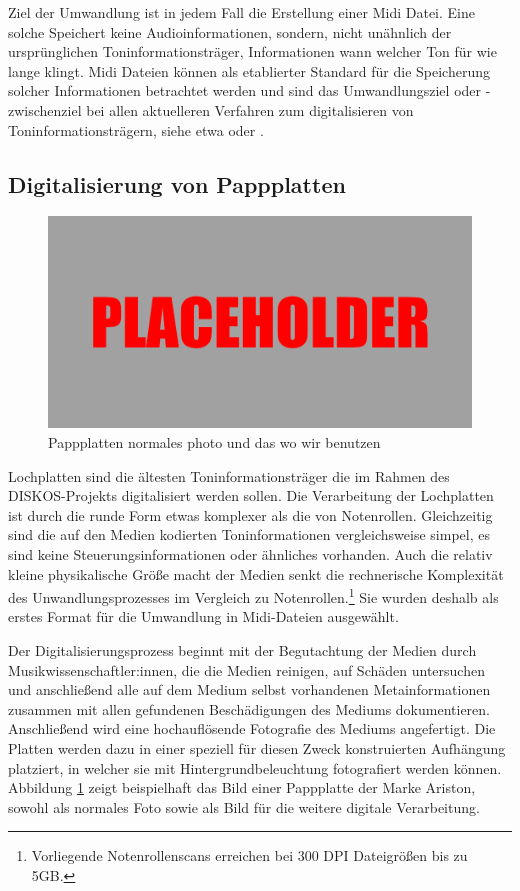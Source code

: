 Ziel der Umwandlung ist in jedem Fall die Erstellung einer Midi Datei.
Eine solche Speichert keine Audioinformationen, sondern, nicht unähnlich der ursprünglichen Toninformationsträger, Informationen wann welcher Ton für wie lange klingt.
Midi Dateien können als etablierter Standard für die Speicherung solcher Informationen betrachtet werden und sind das Umwandlungsziel oder -zwischenziel bei allen aktuelleren Verfahren zum digitalisieren von Toninformationsträgern, siehe etwa \textcite[65]{colmenares_2011} oder \textcite[518]{shi_2019}.


\subsection{Digitalisierung von Pappplatten}

\begin{figure}[t]
    \centering
    \includegraphics[width=\textwidth]{graphics/placeholder.png}
    \caption{Pappplatten normales photo und das wo wir benutzen}
    \label{pappplattenphotos}
\end{figure}

Lochplatten sind die ältesten Toninformationsträger die im Rahmen des DISKOS-Projekts digitalisiert werden sollen.
Die Verarbeitung der Lochplatten ist durch die runde Form etwas komplexer als die von Notenrollen.
Gleichzeitig sind die auf den Medien kodierten Toninformationen vergleichsweise simpel, es sind keine Steuerungsinformationen oder ähnliches vorhanden.
Auch die relativ kleine physikalische Größe macht der Medien senkt die rechnerische Komplexität des Unwandlungsprozesses im Vergleich zu Notenrollen.\footnote{Vorliegende Notenrollenscans erreichen bei 300 DPI Dateigrößen bis zu 5GB.}
Sie wurden deshalb als erstes Format für die Umwandlung in Midi-Dateien ausgewählt.

Der Digitalisierungsprozess beginnt mit der Begutachtung der Medien durch Musikwissenschaftler:innen, die die Medien reinigen, auf Schäden untersuchen und anschließend alle auf dem Medium selbst vorhandenen Metainformationen zusammen mit allen gefundenen Beschädigungen des Mediums dokumentieren.
Anschließend wird eine hochauflösende Fotografie des Mediums angefertigt.
Die Platten werden dazu in einer speziell für diesen Zweck konstruierten Aufhängung platziert, in welcher sie mit Hintergrundbeleuchtung fotografiert werden können.
Abbildung \ref{pappplattenphotos} zeigt beispielhaft das Bild einer Pappplatte der Marke Ariston, sowohl als normales Foto  sowie als Bild für die weitere digitale Verarbeitung.

